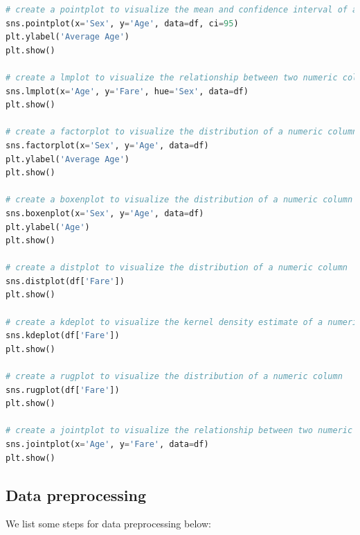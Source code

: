 \documentclass[11pt]{article}
\begin{document}
\begin{mdframed}[backgroundcolor=celadon!6]
\begin{lstlisting}[language=Python]
# create a pointplot to visualize the mean and confidence interval of a numeric column by the categories of a categorical column
sns.pointplot(x='Sex', y='Age', data=df, ci=95)
plt.ylabel('Average Age')
plt.show()

# create a lmplot to visualize the relationship between two numeric columns and the categories of a categorical column
sns.lmplot(x='Age', y='Fare', hue='Sex', data=df)
plt.show()

# create a factorplot to visualize the distribution of a numeric column by the categories of a categorical column
sns.factorplot(x='Sex', y='Age', data=df)
plt.ylabel('Average Age')
plt.show()

# create a boxenplot to visualize the distribution of a numeric column by the categories of a categorical column
sns.boxenplot(x='Sex', y='Age', data=df)
plt.ylabel('Age')
plt.show()

# create a distplot to visualize the distribution of a numeric column
sns.distplot(df['Fare'])
plt.show()

# create a kdeplot to visualize the kernel density estimate of a numeric column
sns.kdeplot(df['Fare'])
plt.show()

# create a rugplot to visualize the distribution of a numeric column
sns.rugplot(df['Fare'])
plt.show()

# create a jointplot to visualize the relationship between two numeric columns and their distributions
sns.jointplot(x='Age', y='Fare', data=df)
plt.show()
\end{lstlisting}
\end{mdframed}


\subsection{Data preprocessing} 


We list some steps for data preprocessing below: 
\end{document}
